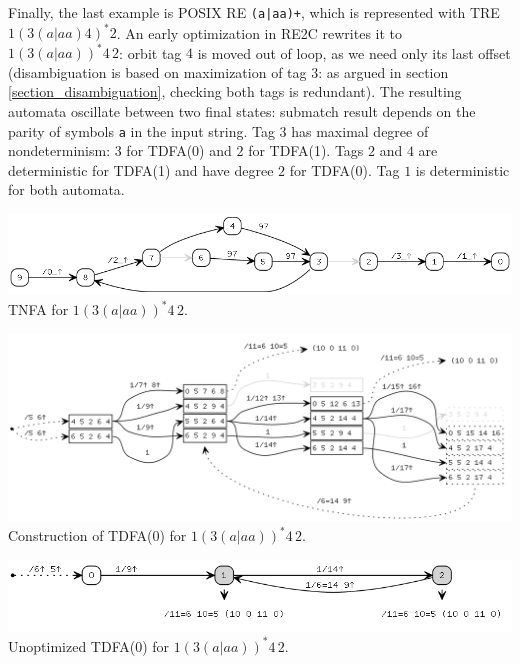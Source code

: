 \documentclass{article}
\theoremstyle{definition}
\begin{document}
\begin{multicols}{2}
Finally, the last example is POSIX RE \texttt{(a|aa)+}, which is represented with TRE $1 (3 (a | aa) 4)^* 2$.
An early optimization in RE2C rewrites it to $1 (3 (a | aa) )^* 4 \, 2$:
orbit tag $4$ is moved out of loop, as we need only its last offset
(disambiguation is based on maximization of tag $3$: as argued in section \ref{section_disambiguation}, checking both tags is redundant).
The resulting automata oscillate between two final states:
submatch result depends on the parity of symbols \texttt{a} in the input string.
Tag $3$ has maximal degree of nondeterminism: $3$ for TDFA(0) and $2$ for TDFA(1).
Tags $2$ and $4$ are deterministic for TDFA(1) and have degree $2$ for TDFA(0).
Tag $1$ is deterministic for both automata.
\begin{center}
\includegraphics[width=\linewidth]{img/example4/tnfa.png}\\
\footnotesize{TNFA for $1 (3 (a | aa) )^* 4 \, 2$.} \\
\end{center}
\begin{center}
\includegraphics[width=\linewidth]{img/example4/tdfa0_raw.png}\\
\footnotesize{Construction of TDFA(0) for $1 (3 (a | aa) )^* 4 \, 2$.} \\
\end{center}
\begin{center}
\includegraphics[width=\linewidth]{img/example4/tdfa0.png}\\
\footnotesize{Unoptimized TDFA(0) for $1 (3 (a | aa) )^* 4 \, 2$.} \\

\end{center}
\end{multicols}
\end{document}
